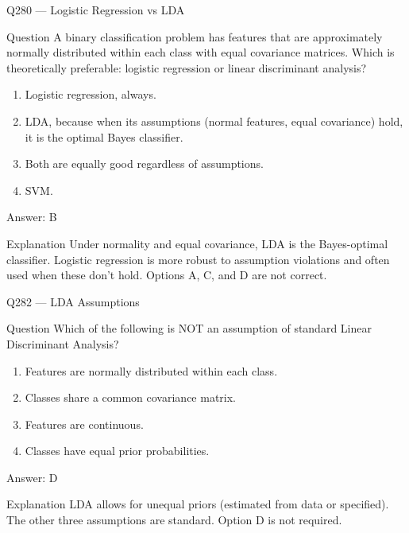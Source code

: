 \documentclass[aspectratio=169,8pt]{beamer}
\begin{document}
\begin{frame}{Q280 --- Logistic Regression vs LDA}
\begin{block}{Question}
A binary classification problem has features that are approximately normally distributed within each class with equal covariance matrices. Which is theoretically preferable: logistic regression or linear discriminant analysis?
\end{block}
\begin{enumerate}
\item Logistic regression, always.
\item LDA, because when its assumptions (normal features, equal covariance) hold, it is the optimal Bayes classifier.
\item Both are equally good regardless of assumptions.
\item SVM.
\end{enumerate}
\begin{exampleblock}{Answer: B}\end{exampleblock}
\begin{block}{Explanation}
Under normality and equal covariance, LDA is the Bayes-optimal classifier. Logistic regression is more robust to assumption violations and often used when these don't hold. Options A, C, and D are not correct.
\end{block}
\end{frame}



\begin{frame}{Q282 --- LDA Assumptions}
\begin{block}{Question}
Which of the following is NOT an assumption of standard Linear Discriminant Analysis?
\begin{enumerate}
\item Features are normally distributed within each class.
\item Classes share a common covariance matrix.
\item Features are continuous.
\item Classes have equal prior probabilities.
\end{enumerate}\end{block}
\begin{exampleblock}{Answer: D}\end{exampleblock}
\begin{block}{Explanation}
LDA allows for unequal priors (estimated from data or specified). The other three assumptions are standard. Option D is not required.
\end{block}
\end{frame}
\end{document}
